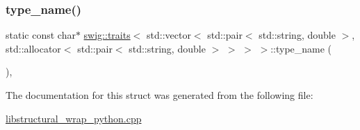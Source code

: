 \subsubsection{\texorpdfstring{type\+\_\+name()}{type\_name()}}
{\footnotesize\ttfamily static const char$\ast$ \hyperlink{structswig_1_1traits}{swig\+::traits}$<$ std\+::vector$<$ std\+::pair$<$ std\+::string, double $>$, std\+::allocator$<$ std\+::pair$<$ std\+::string, double $>$ $>$ $>$ $>$\+::type\+\_\+name (\begin{DoxyParamCaption}{ }\end{DoxyParamCaption})\hspace{0.3cm}{\ttfamily [inline]}, {\ttfamily [static]}}



The documentation for this struct was generated from the following file\+:\begin{DoxyCompactItemize}
\item 
\hyperlink{libstructural__wrap__python_8cpp}{libstructural\+\_\+wrap\+\_\+python.\+cpp}\end{DoxyCompactItemize}
